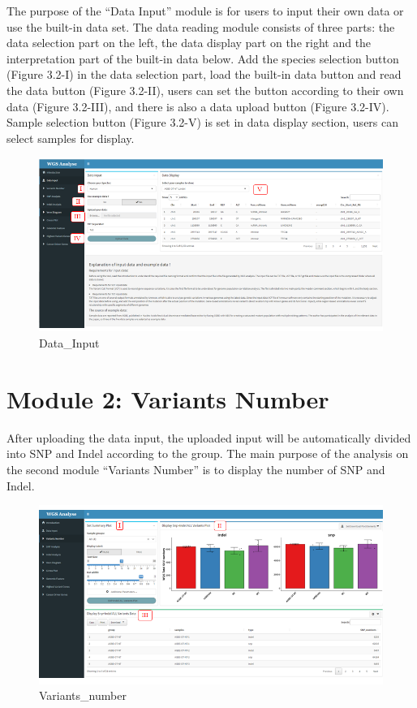 \documentclass[
]{book}
\theoremstyle{definition}
\theoremstyle{definition}
\theoremstyle{definition}
\theoremstyle{definition}
\theoremstyle{remark}
\begin{document}
The purpose of the ``Data Input'' module is for users to input their own data or use the built-in data set. The data reading module consists of three parts: the data selection part on the left, the data display part on the right and the interpretation part of the built-in data below. Add the species selection button (Figure 3.2-I) in the data selection part, load the built-in data button and read the data button (Figure 3.2-II), users can set the button according to their own data (Figure 3.2-III), and there is also a data upload button (Figure 3.2-IV). Sample selection button (Figure 3.2-V) is set in data display section, users can select samples for display.

\begin{figure}
\includegraphics[width=1\linewidth]{figure/Input-page_1} \caption{Data_Input}\label{fig:unnamed-chunk-7}
\end{figure}

\hypertarget{module-2-variants-number}{%
\section{Module 2: Variants Number}\label{module-2-variants-number}}

After uploading the data input, the uploaded input will be automatically divided into SNP and Indel according to the group. The main purpose of the analysis on the second module ``Variants Number'' is to display the number of SNP and Indel.

\begin{figure}
\includegraphics[width=1\linewidth]{figure/1.Variants_numbers_1} \caption{Variants_number}\label{fig:unnamed-chunk-8}
\end{figure}
\end{document}
